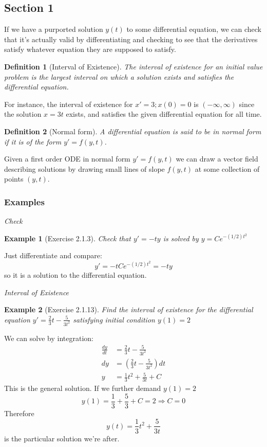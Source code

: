 \documentclass[14pt]{article}
\newtheorem{defn}{Definition}
\newtheorem{ex}{Example}
\begin{document}
\subsection{Section 1}

If we have a purported solution $y(t)$ to some differential equation, we can check that it's
actually valid by differentiating and checking to see that the derivatives satisfy whatever equation
they are supposed to satisfy.

\begin{defn}[Interval of Existence]
  The \emph{interval of existence} for an initial value problem is the largest interval on which a
  solution exists and satisfies the differential equation.
\end{defn}

For instance, the interval of existence for $x' =3; x(0)=0$ is $(-\infty, \infty)$ since the
solution $x = 3t$ exists, and satisfies the given differential equation for all time.


\begin{defn}[Normal form]
  A differential equation is said to be in \emph{normal form} if it is of the form $y' = f(y,t)$.
\end{defn}

Given a first order ODE in normal form $y' = f(y,t)$ we can draw a vector field describing solutions
by drawing small lines of slope $f(y,t)$ at some collection of points $(y,t)$.

\subsubsection*{Examples}

\emph{Check}
\begin{ex}[Exercise 2.1.3] Check that $y' = -ty$ is solved by $y = C e ^{-(1/2) t^2}$\end{ex}

Just differentiate and compare:
\[y' = -t C e^{-(1/2) t^2} = -t y\]
so it is a solution to the differential equation.

\emph{Interval of Existence}
\begin{ex}[Exercise 2.1.13] Find the interval of existence for the differential equation $y' =
  \frac{2}{3} t - \frac{5}{3 t^2}  $ satisfying initial condition $y(1) = 2$ \end{ex}

We can solve by integration:
\begin{align*}
\frac{dy}{dt}  &= \frac{2}{3} t - \frac{5}{3 t^2}\\
dy &= \left( \frac{2}{3} t - \frac{5}{3 t^2} \right) dt\\
y &= \frac{1}{3} t^2 + \frac{5}{3t} + C
\end{align*}
This is the general solution. If we further demand $y(1) = 2$
\[y(1) = \frac{1}{3} + \frac{5}{3} + C = 2 \Rightarrow C = 0\]
Therefore
\[y(t) = \frac{1}{3} t^2 + \frac{5}{3 t} \]
is the particular solution we're after.
\end{document}
